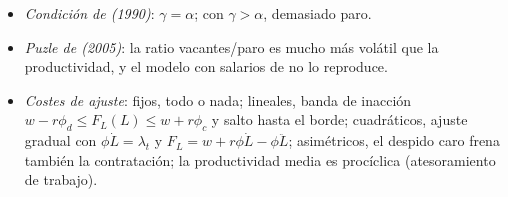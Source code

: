 \documentclass[11pt]{article}
\begin{document}
\begin{itemize}
\item \emph{Condición de  (1990)}: $\gamma=\alpha$; con $\gamma>\alpha$, demasiado paro.
\item \emph{Puzle de  (2005)}: la ratio vacantes/paro es mucho más volátil que la productividad, y el modelo con salarios de  no lo reproduce.
\item \emph{Costes de ajuste}: fijos, todo o nada; lineales, banda de inacción $w-r\phi_d\leq F_L(L)\leq w+r\phi_c$ y salto hasta el borde; cuadráticos, ajuste gradual con $\phi\dot L=\lambda_t$ y $F_L=w+r\phi\dot L-\phi\ddot L$; asimétricos, el despido caro frena también la contratación\nocite{BentolilaBertola1990Firing}; la productividad media es procíclica (atesoramiento de trabajo).
\end{itemize}

\nocite{FallonVerry1988Economics,Smith2003Labour}

\bibliografia
\end{document}
